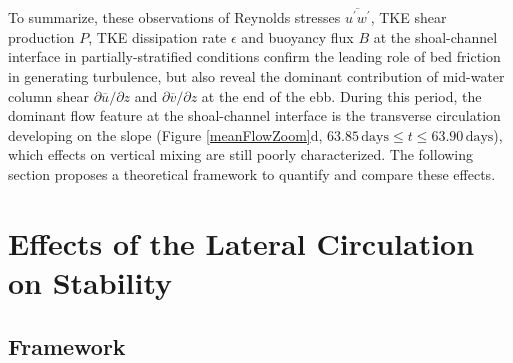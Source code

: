  
To summarize, these observations of Reynolds stresses $\overline{u^{\prime} w^{\prime}}$, TKE shear production $P$, TKE dissipation rate $\epsilon$ and buoyancy flux $B$ at the shoal-channel interface in partially-stratified conditions confirm the leading role of bed friction in generating turbulence, but also reveal the dominant contribution of mid-water column shear $\partial \overline{u} / \partial z$ and $\partial \overline{v} / \partial z$ at the end of the ebb. During this period, the dominant flow feature at the shoal-channel interface is the transverse circulation developing on the slope (Figure {\ref{meanFlowZoom}d, $63.85\, \mathrm{days} \leq t \leq 63.90 \, \mathrm{days}$}), which effects on vertical mixing are still poorly characterized. The following section proposes a theoretical framework to quantify and compare these effects.



\section{Effects of the Lateral Circulation on Stability}
\label{effectsCirculationStability}

\subsection{Framework}

